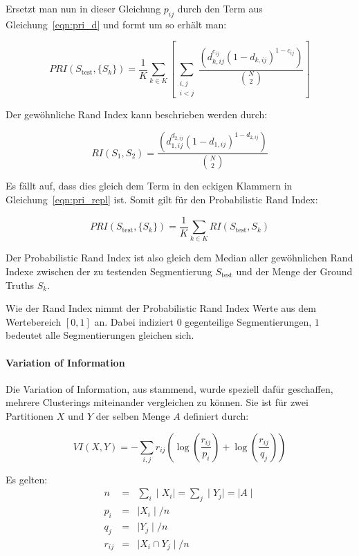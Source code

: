 Ersetzt man nun in dieser Gleichung $p_{ij}$ durch den Term aus Gleichung~\ref{eqn:pri_d} und formt um so erhält man:

\begin{equation}
\label{eqn:pri_repl}
PRI(S_\text{test}, \{S_k\}) = \frac{1}{K}\sum_{k\in K}\left[ \sum_{\substack{i,j\\i<j}}\frac{\left(d_{k,ij}^{c_{ij}}\left(1-d_{k,ij}\right)^{1-c_{ij}}\right)}{\binom{N}{2}}\right]
\end{equation}

Der gewöhnliche Rand Index kann beschrieben werden durch:

\begin{equation}
RI(S_1, S_2) = \frac{\left(d_{1,ij}^{d_{2,ij}}\left(1-d_{1,ij}\right)^{1-d_{2,ij}}\right)}{\binom{N}{2}}
\end{equation}

Es fällt auf, dass dies gleich dem Term in den eckigen Klammern in Gleichung~\ref{eqn:pri_repl} ist. Somit gilt für den Probabilistic Rand Index:

\begin{equation}
PRI(S_\text{test}, \{S_k\}) = \frac{1}{K}\sum_{k\in K}RI(S_\text{test}, S_k)
\end{equation}

Der Probabilistic Rand Index ist also gleich dem Median aller gewöhnlichen Rand Indexe zwischen der zu testenden Segmentierung $S_\text{test}$ und der Menge der Ground Truths ${S_k}$.

Wie der Rand Index nimmt der Probabilistic Rand Index Werte aus dem Wertebereich $\left[0, 1\right]$ an. Dabei indiziert $0$ gegenteilige Segmentierungen, $1$ bedeutet alle Segmentierungen gleichen sich. \cite{pantofaru_07}

\paragraph{Variation of Information}

Die Variation of Information, aus \cite{meil_03} stammend, wurde speziell dafür geschaffen, mehrere Clusterings miteinander vergleichen zu können. Sie ist für zwei Partitionen $X$ und $Y$ der selben Menge $A$ definiert durch:

\begin{equation}
VI(X, Y) = -\sum_{i, j} r_{ij}\left(\log\left(\frac{r_{ij}}{p_i}\right)+\log\left(\frac{r_{ij}}{q_j}\right)\right)
\end{equation}

Es gelten:
\begin{eqnarray}
n&=&\sum_i\mid X_i\mid=\sum_j \mid Y_j\mid=\mid A\mid\\
p_i&=&\mid X_i\mid/n\\
q_j&=&\mid Y_j\mid/n\\
r_{ij}&=&\mid X_i\cap Y_j\mid/n\\
\end{eqnarray}

